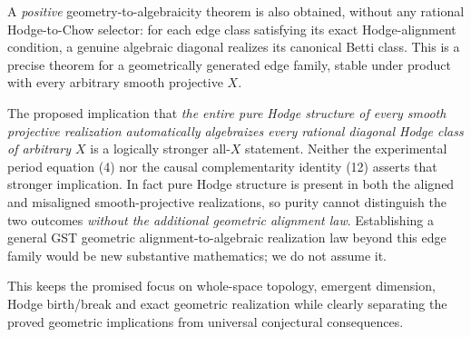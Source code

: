 \documentclass[11pt]{article}
\begin{document}
A \emph{positive} geometry-to-algebraicity theorem
is also obtained, without any rational Hodge-to-Chow
selector: for each edge class satisfying its exact
Hodge-alignment condition, a genuine algebraic
diagonal realizes its canonical Betti class.
This is a precise theorem for a geometrically
generated edge family, stable under product with
every arbitrary smooth projective $X$.

The proposed implication that \emph{the entire pure
Hodge structure of every smooth projective
realization automatically algebraizes every
rational diagonal Hodge class of arbitrary $X$}
is a logically stronger all-$X$ statement.
Neither the experimental period equation (4)
nor the causal complementarity identity (12)
asserts that stronger implication. In fact
pure Hodge structure is present in both the
aligned and misaligned smooth-projective
realizations, so purity cannot distinguish the
two outcomes \emph{without the additional
geometric alignment law}. Establishing a general
GST geometric alignment-to-algebraic realization
law beyond this edge family would be new
substantive mathematics; we do not assume it.

This keeps the promised focus on whole-space
topology, emergent dimension, Hodge birth/break
and exact geometric realization while clearly
separating the proved geometric implications
from universal conjectural consequences.
\end{document}
